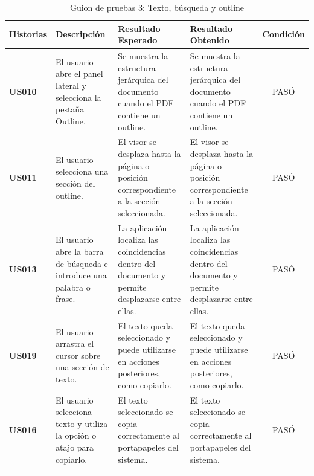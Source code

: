 \begin{longtable}{ | p{2cm} | p{3cm} | p{4cm} | p{4cm} | c |}
      \hline
      \textbf{Historias} & \textbf{Descripción} & \textbf{Resultado Esperado} & \textbf{Resultado Obtenido} & \textbf{Condición}\\
      \hline
      \textbf{US010} & El usuario abre el panel lateral y selecciona la pestaña Outline. & Se muestra la estructura jerárquica del documento cuando el PDF contiene un outline. & Se muestra la estructura jerárquica del documento cuando el PDF contiene un outline. & PASÓ \\
      \hline

      \textbf{US011} & El usuario selecciona una sección del outline. & El visor se desplaza hasta la página o posición correspondiente a la sección seleccionada. & El visor se desplaza hasta la página o posición correspondiente a la sección seleccionada. & PASÓ \\
      \hline

      \textbf{US013} & El usuario abre la barra de búsqueda e introduce una palabra o frase. & La aplicación localiza las coincidencias dentro del documento y permite desplazarse entre ellas. & La aplicación localiza las coincidencias dentro del documento y permite desplazarse entre ellas. & PASÓ \\
      \hline

      \textbf{US019} & El usuario arrastra el cursor sobre una sección de texto. & El texto queda seleccionado y puede utilizarse en acciones posteriores, como copiarlo. & El texto queda seleccionado y puede utilizarse en acciones posteriores, como copiarlo. & PASÓ \\
      \hline

      \textbf{US016} & El usuario selecciona texto y utiliza la opción o atajo para copiarlo. & El texto seleccionado se copia correctamente al portapapeles del sistema. &  El texto seleccionado se copia correctamente al portapapeles del sistema. & PASÓ \\
      \hline
      
      \caption{Guion de pruebas 3: Texto, búsqueda y outline}
      \label{TestScript1}
\end{longtable}

